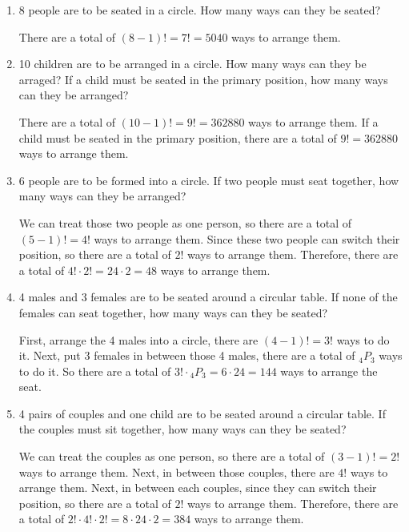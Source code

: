 \documentclass{report}
\newcommand\permtwo[2][^n]{{}_{#1}P_{#2}}
\begin{document}
\begin{multicols}{2}
  \begin{enumerate}
    \item 8 people are to be seated in a circle. How many ways can they be seated?
          \sol{}

          There are a total of $(8-1)! = 7! = 5040$ ways to arrange them.

    \item 10 children are to be arranged in a circle. How many ways can they be
          arraged? If a child must be seated in the primary position, how many ways can they be arranged?
          \sol{}

          There are a total of $(10-1)! = 9! = 362880$ ways to arrange them. If a child
          must be seated in the primary position, there are a total of $9! = 362880$ ways
          to arrange them.

    \item 6 people are to be formed into a circle. If two people must seat together, how many ways can they be arranged?
          \sol{}

          We can treat those two people as one person, so there are a total of $(5-1)! =
            4!$ ways to arrange them. Since these two people can switch their position, so
          there are a total of $2!$ ways to arrange them. Therefore, there are a total of
          $4! \cdot 2! = 24 \cdot 2 = 48$ ways to arrange them.

    \item 4 males and 3 females are to be seated around a circular table. If none of the females can seat together, how many ways can they be seated?
          \sol{}

          First, arrange the 4 males into a circle, there are $(4-1)! = 3!$ ways to do
          it. Next, put 3 females in between those 4 males, there are a total of
          $\permtwo[4]{3}$ ways to do it. So there are a total of $3! \cdot
            \permtwo[4]{3} = 6 \cdot 24 = 144$ ways to arrange the seat.

    \item 4 pairs of couples and one child are to be seated around a circular table. If the couples must sit together, how many ways can they be seated?
          \sol{}

          We can treat the couples as one person, so there are a total of $(3-1)! = 2!$
          ways to arrange them. Next, in between those couples, there are $4!$ ways to
          arrange them. Next, in between each couples, since they can switch their
          position, so there are a total of $2!$ ways to arrange them. Therefore, there
          are a total of $2! \cdot 4! \cdot 2! = 8 \cdot 24 \cdot 2 = 384$ ways to
          arrange them.


\end{enumerate}
\end{multicols}
\end{document}

